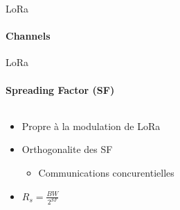 \begin{frame}{LoRa}
\framesubtitle{Channels}
\end{frame}

\begin{frame}{LoRa}
\framesubtitle{Spreading Factor (SF)}
\begin{columns}
  \begin{column}{0.4\textwidth}
    \begin{itemize}
      \item Propre à la modulation de LoRa
      \item Orthogonalite des SF
      \begin{itemize}
        \item Communications concurentielles
      \end{itemize}
      \item  $R_{s} = \frac{BW}{2^{SF}}$
    \end{itemize}
  \end{column}
  \begin{column}{0.6\textwidth}
    
  \end{column}
\end{columns}
\end{frame}
